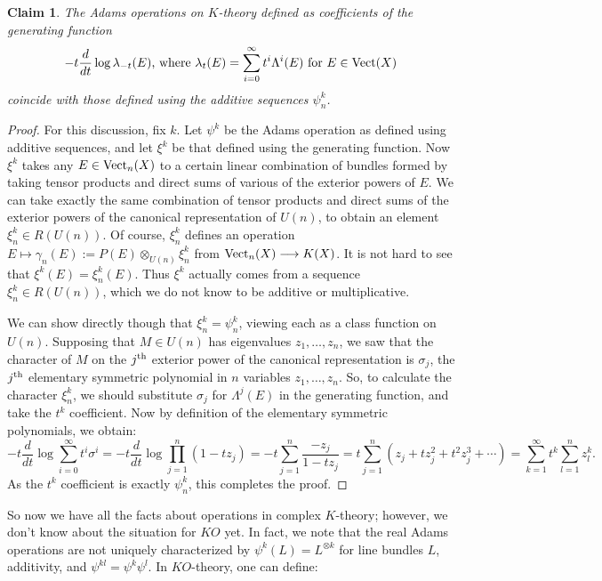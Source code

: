 \documentclass{article}
\newcommand{\Vect}{\textup{Vect}}
\renewcommand{\to}{\longrightarrow}
\renewcommand{\mapsto}{\longmapsto}
\newtheorem{claim}[thm]{Claim}
\theoremstyle{definition}
\begin{document}
\begin{claim}
The Adams operations on $K$-theory defined as coefficients of the generating function
\[-t \frac{d}{dt}\log \lambda_{-t}(E)\textup{, where }\lambda_t(E)=\sum_{i=0}^\infty t^i\Lambda^i(E)\text{ for } E\in\Vect(X)\]
coincide with those defined using the additive sequences $\psi^k_n$.
\end{claim}
\begin{proof}
For this discussion, fix $k$. Let $\psi^k$ be the Adams operation as defined using additive sequences, and let $\xi^k$ be that defined using the generating function. Now $\xi^k$ takes any $E\in\Vect_n(X)$ to a certain linear combination of bundles formed by taking tensor products and direct sums of various of the exterior powers of $E$. We can take exactly the same combination of tensor products and direct sums of the exterior powers of the canonical representation of $U(n)$, to obtain an element $\xi^k_n\in R(U(n))$. Of course, $\xi^k_n$ defines an operation $E\mapsto \gamma_n(E):=P(E)\otimes_{U(n)}\xi^k_n$ from $\Vect_n(X)\to K(X)$. It is not hard to see that $\xi^k(E)=\xi^k_n(E)$. Thus $\xi^k$ actually comes from a sequence $\xi^k_n\in R(U(n))$, which we do not know to be additive or multiplicative.

We can show directly though that $\xi^k_n=\psi^k_n$, viewing each as a class function on $U(n)$. Supposing that $M\in U(n)$ has eigenvalues $z_1,\ldots,z_n$, we saw that the character of $M$ on the $j^\textup{th}$ exterior power of the canonical representation is $\sigma_j$, the $j^\textup{th}$ elementary symmetric polynomial in $n$ variables $z_1,\ldots,z_n$. So, to calculate the character $\xi^k_n$, we should substitute $\sigma_j$ for $\Lambda^j(E)$ in the generating function, and take the $t^k$ coefficient.
Now by definition of the elementary symmetric polynomials, we obtain:
\[-t\frac{d}{dt}\log\sum_{i=0}^\infty t^i\sigma^i
=-t\frac{d}{dt}\log\prod_{j=1}^n(1-t z_j)=-t\sum_{j=1}^n\frac{-z_j}{1-tz_j}=t\sum_{j=1}^n \left(z_j+tz_j^2+t^2z_j^3+\cdots\right)=\sum_{k=1}^\infty t^k \sum_{l=1}^nz_l^k.\]
As the $t^k$ coefficient is exactly $\psi^k_n$, this completes the proof.
\end{proof}
So now we have all the facts about operations in complex $K$-theory; however, we don't know about the situation for $KO$ yet.  In fact, we note that the real Adams operations are not uniquely characterized by $\psi^k(L) = L^{\otimes k}$ for line bundles $L$, additivity, and $\psi^{kl} = \psi^k \psi^l$.  In $KO$-theory, one can define:
\end{document}
